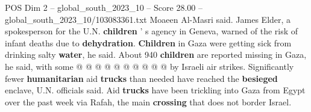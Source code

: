 \begin{textsample}{POS Dim 2 – global\_south\_2023\_10 – Score 28.00 – global\_south\_2023\_10/103083361.txt}
Moaeen Al-Masri said.
James Elder, a spokesperson for the U.N. \textbf{children} ' s agency in Geneva, warned of the risk of infant deaths due to \textbf{dehydration}. \textbf{Children} in Gaza were getting sick from drinking salty \textbf{water}, he said.
About 940 \textbf{children} are reported missing in Gaza, he said, with some @ @ @ @ @ @ @ @ @ @ by Israeli air strikes.
Significantly fewer \textbf{humanitarian} aid \textbf{trucks} than needed have reached the \textbf{besieged} enclave, U.N. officials said.
Aid \textbf{trucks} have been trickling into Gaza from Egypt over the past week via Rafah, the main \textbf{crossing} that does not border Israel.

\end{textsample}
